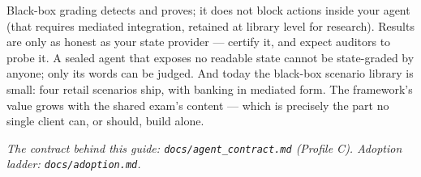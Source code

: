 \documentclass[11pt]{article}
\begin{document}
Black-box grading detects and proves; it does not block actions inside your
agent (that requires mediated integration, retained at library level for
research). Results are only as honest as your state provider --- certify it,
and expect auditors to probe it. A sealed agent that exposes no readable
state cannot be state-graded by anyone; only its words can be judged. And
today the black-box scenario library is small: four retail scenarios ship,
with banking in mediated form. The framework's value grows with the shared
exam's content --- which is precisely the part no single client can, or
should, build alone.

\vspace{1em}
\noindent\emph{The contract behind this guide: \texttt{docs/agent\_contract.md}
(Profile C). Adoption ladder: \texttt{docs/adoption.md}.}
\end{document}
